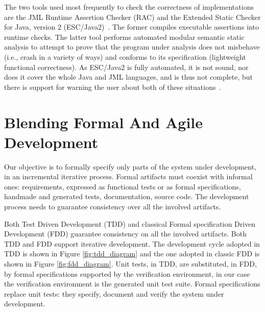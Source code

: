 \documentclass[english]{lni}
\begin{document}
The two tools used most frequently to check the correctness of
implementations are the JML Runtime Assertion Checker (RAC) and the
Extended Static Checker for Java, version 2
(ESC/Java2)~\cite{Cheon-Leavens02b,BurdyEtal05-STTT,KiniryCok04}.  The
former compiles executable assertions into runtime checks.  The latter
tool performs automated modular semantic static analysis to attempt to
prove that the program under analysis does not misbehave (i.e., crash
in a variety of ways) and conforms to its specification (lightweight
functional correctness).  As ESC/Java2 is fully automated, it is not
sound, nor does it cover the whole Java and JML languages, and is thus
not complete, but there is support for warning the user about both of
these situations~\cite{KiniryEtal06}.

\section{Blending Formal And Agile Development}
\label{sec:blending_formal_and_agile_development}

Our objective is to formally specify only parts of the system under development, in an incremental iterative process.
Formal artifacts must coexist with informal ones: requirements, expressed as functional tests or as formal specifications, handmade and generated tests, documentation, source code.
The development process needs to guarantee consistency over all the involved artifacts.

Both Test Driven Development (TDD) and classical Formal specification Driven Development (FDD) guarantee consistency on all the involved artifacts. 
Both TDD and FDD support iterative development.
The development cycle adopted in TDD is shown in Figure \ref{fig:tdd_diagram} and the one adopted in classic FDD is shown in Figure \ref{fig:fdd_diagram}.
Unit tests, in TDD, are substituted, in FDD, by formal specifications supported by the verification environment, in our case the verification environment is the generated unit test suite.
Formal specifications replace unit tests: they specify, document and verify the system under development.
\end{document}
